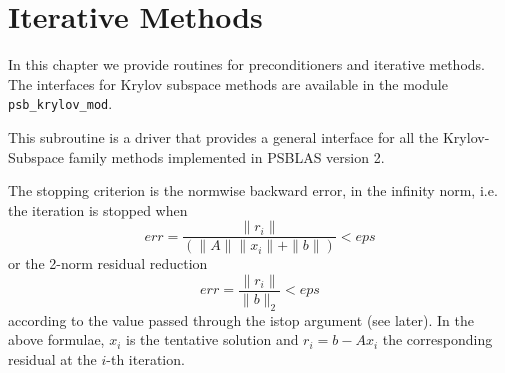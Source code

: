 \section{Iterative Methods}
\label{sec:methods}

In this chapter we provide routines for preconditioners and iterative
methods. The interfaces for Krylov subspace methods are available in
the module \verb|psb_krylov_mod|.

%
%


This subroutine is a driver that provides a general interface for all
the Krylov-Subspace family methods implemented in PSBLAS version 2. 

The stopping criterion is the normwise backward error, in the infinity
norm, i.e. the iteration is stopped when 
\[ err = \frac{\|r_i\|}{(\|A\|\|x_i\|+\|b\|)} < eps \]
or the 2-norm residual reduction
\[ err = \frac{\|r_i\|}{\|b\|_2} < eps \]
according to the value passed through the  istop argument (see
later). In the above formulae, $x_i$ is the tentative solution and
$r_i=b-Ax_i$ the corresponding residual at the $i$-th iteration. 



